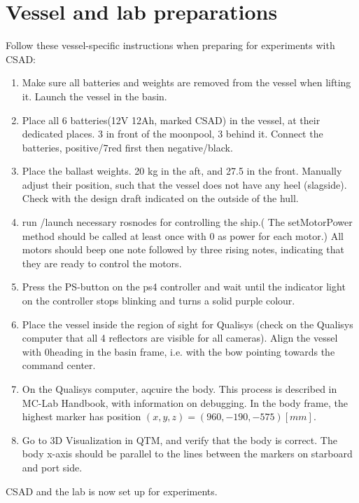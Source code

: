\section{Vessel and lab preparations}
Follow these vessel-specific instructions when preparing for experiments with CSAD: 
\begin{enumerate}
	\item Make sure all batteries and weights are removed from the vessel when lifting it. Launch the vessel in the basin. 
	\item Place all 6 batteries(12V 12Ah, marked CSAD) in the vessel, at their dedicated places. 3 in front of the moonpool, 3 behind it. Connect the batteries, positive/7red first then negative/black. 
	\item Place the ballast weights. 20 kg in the aft, and 27.5 in the front. Manually adjust their position, such that the vessel does not have any heel (slagside). Check with the design draft indicated on the outside of the hull. 
	\item run /launch necessary rosnodes for controlling the ship.( The setMotorPower method should be called at least once with 0 as power for each motor.) All motors should beep one note followed by three rising notes, indicating that they are ready to control the motors.
	\item Press the PS-button on the ps4 controller and wait until the indicator light on the controller stops blinking and turns a solid purple colour.
	\item Place the vessel inside the region of sight for Qualisys (check on the Qualisys computer that all 4 reflectors are visible for all cameras). Align the vessel with 0\degree heading in the basin frame, i.e. with the bow pointing towards the command center. 
	\item On the Qualisys computer, aqcuire the body. This process is described in MC-Lab Handbook, with information on debugging. In the body frame, the highest marker has position $(x,y,z)=(960,-190,-575)[mm]$. 
	\item Go to 3D Visualization in QTM, and verify that the body is correct. The body x-axis should be parallel to the lines between the markers on starboard and port side.
\end{enumerate}
CSAD and the lab is now set up for experiments. 

